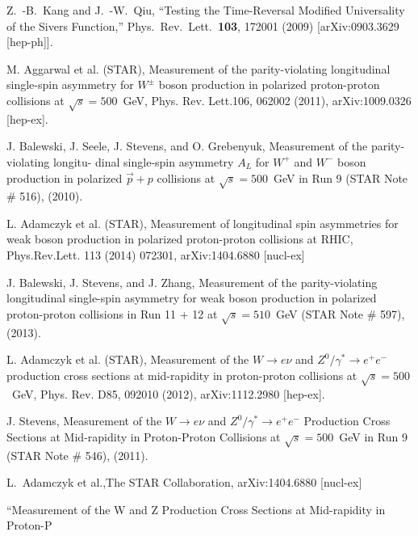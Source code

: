 \documentclass[12pt]{article}
\begin{document}
\begin{thebibliography}{9}


  Z.~-B.~Kang and J.~-W.~Qiu,
  ``Testing the Time-Reversal Modified Universality of the Sivers Function,''
  Phys.\ Rev.\ Lett.\  {\bf 103}, 172001 (2009)
  [arXiv:0903.3629 [hep-ph]].

M. Aggarwal et al. (STAR), Measurement of the parity-violating longitudinal single-spin asymmetry
for $W^{\pm}$ boson production in polarized proton-proton collisions at $\sqrt{s} = 500$~GeV, 
Phys. Rev. Lett.106, 062002 (2011), 
arXiv:1009.0326 [hep-ex].

J. Balewski, J. Seele, J. Stevens, and O. Grebenyuk, Measurement of the parity-violating longitu-
dinal single-spin asymmetry $A_{L}$ for $W^{+}$ and $W^{-}$ boson production in polarized $\vec{p} + p$ collisions at
$\sqrt{s}=500$~GeV in Run 9 (STAR Note \# 516), (2010).

L. Adamczyk et al. (STAR), Measurement of longitudinal spin asymmetries for weak boson production in polarized proton-proton collisions at RHIC, 
Phys.Rev.Lett. 113 (2014) 072301, 
arXiv:1404.6880 [nucl-ex]

J. Balewski, J. Stevens, and J. Zhang, Measurement of the parity-violating longitudinal single-spin
asymmetry for weak boson production in polarized proton-proton collisions in Run 11 + 12 at
$\sqrt{s} = 510$~GeV (STAR Note \# 597), (2013).

L. Adamczyk et al. (STAR), Measurement of the $W\rightarrow e\nu$ and $Z^{0}/\gamma^{*}\rightarrow e^{+}e^{-}$ 
production cross sections at mid-rapidity in proton-proton collisions at
$\sqrt{s} = 500$~GeV, 
Phys. Rev. D85, 092010 (2012), 
arXiv:1112.2980 [hep-ex].

J. Stevens, Measurement of the $W\rightarrow e\nu$ and $Z^{0}/\gamma^{*}\rightarrow e^{+}e^{-}$  
Production Cross Sections at Mid-rapidity in Proton-Proton Collisions at
$\sqrt{s}=500$~GeV in Run 9 (STAR Note \# 546), (2011).

L.~Adamczyk et al.,The STAR Collaboration, arXiv:1404.6880 [nucl-ex]

``Measurement of the W and Z Production Cross Sections at Mid-rapidity in Proton-P

\end{thebibliography}
\end{document}
